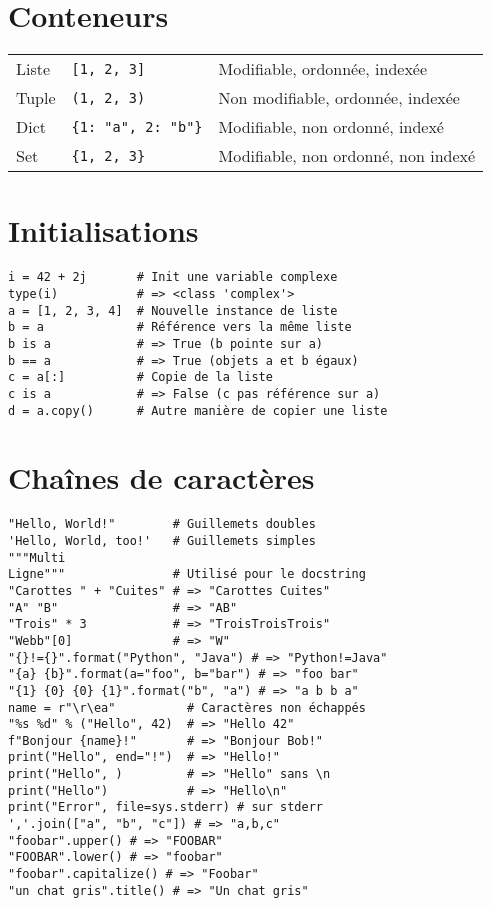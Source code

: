 \documentclass{article}
\begin{document}
\begin{multicols*}{4}
\section*{Conteneurs}

\begin{tabularx}{\columnwidth}{llX}
Liste & \texttt{[1, 2, 3]} & Modifiable, ordonnée, indexée \\
Tuple & \texttt{(1, 2, 3)} & Non modifiable, ordonnée, indexée \\
Dict & \texttt{\{1: "a", 2: "b"\}} & Modifiable, non ordonné, indexé \\
Set & \texttt{\{1, 2, 3\}} & Modifiable, non ordonné, non indexé \\

\end{tabularx}

\section*{Initialisations}

\begin{lstlisting}
i = 42 + 2j       # Init une variable complexe
type(i)           # => <class 'complex'>
a = [1, 2, 3, 4]  # Nouvelle instance de liste
b = a             # Référence vers la même liste
b is a            # => True (b pointe sur a)
b == a            # => True (objets a et b égaux)
c = a[:]          # Copie de la liste
c is a            # => False (c pas référence sur a)
d = a.copy()      # Autre manière de copier une liste
\end{lstlisting}

\section*{Chaînes de caractères}

\begin{lstlisting}
"Hello, World!"        # Guillemets doubles
'Hello, World, too!'   # Guillemets simples
"""Multi
Ligne"""               # Utilisé pour le docstring
"Carottes " + "Cuites" # => "Carottes Cuites"
"A" "B"                # => "AB"
"Trois" * 3            # => "TroisTroisTrois"
"Webb"[0]              # => "W"
"{}!={}".format("Python", "Java") # => "Python!=Java"
"{a} {b}".format(a="foo", b="bar") # => "foo bar"
"{1} {0} {0} {1}".format("b", "a") # => "a b b a"
name = r"\r\ea"          # Caractères non échappés
"%s %d" % ("Hello", 42)  # => "Hello 42"
f"Bonjour {name}!"       # => "Bonjour Bob!"
print("Hello", end="!")  # => "Hello!"
print("Hello", )         # => "Hello" sans \n
print("Hello")           # => "Hello\n"
print("Error", file=sys.stderr) # sur stderr
','.join(["a", "b", "c"]) # => "a,b,c"
"foobar".upper() # => "FOOBAR"
"FOOBAR".lower() # => "foobar"
"foobar".capitalize() # => "Foobar"
"un chat gris".title() # => "Un chat gris"


\end{lstlisting}
\end{multicols*}
\end{document}
